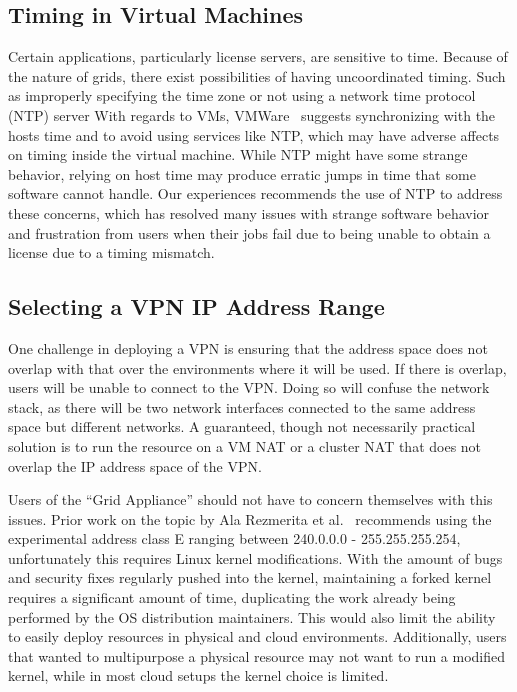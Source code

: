 \documentclass[conference]{IEEEtran}
\begin{document}
\subsection{Timing in Virtual Machines}

Certain applications, particularly license servers, are sensitive to time.
Because of the nature of grids, there exist possibilities of having
uncoordinated timing.  Such as improperly specifying the time zone or not using
a network time protocol (NTP) server With regards to VMs,
VMWare~\cite{vmware_timing} suggests synchronizing with the hosts time and to
avoid using services like NTP, which may have adverse affects on timing inside
the virtual machine.  While NTP might have some strange behavior, relying on
host time may produce erratic jumps in time that some software cannot handle.
Our experiences recommends the use of NTP to address these concerns, which has
resolved many issues with strange software behavior and frustration from users
when their jobs fail due to being unable to obtain a license due to a timing
mismatch.

\subsection{Selecting a VPN IP Address Range}

One challenge in deploying a VPN is ensuring that the address space does not
overlap with that over the environments where it will be used.  If there is
overlap, users will be unable to connect to the VPN.  Doing so will confuse the
network stack, as there will be two network interfaces connected to the same
address space but different networks.  A guaranteed, though not necessarily
practical solution is to run the resource on a VM NAT or a cluster NAT that
does not overlap the IP address space of the VPN.

Users of the ``Grid Appliance'' should not have to concern themselves with this
issues.  Prior work on the topic by Ala Rezmerita et al.~\cite{pvc} recommends
using the experimental address class E ranging between 240.0.0.0 -
255.255.255.254, unfortunately this requires Linux kernel modifications.  With
the amount of bugs and security fixes regularly pushed into the kernel,
maintaining a forked kernel requires a significant amount of time, duplicating
the work already being performed by the OS distribution maintainers.  This
would also limit the ability to easily deploy resources in physical and cloud
environments.  Additionally, users that wanted to multipurpose a physical
resource may not want to run a modified kernel, while in most cloud setups the
kernel choice is limited.
\end{document}
